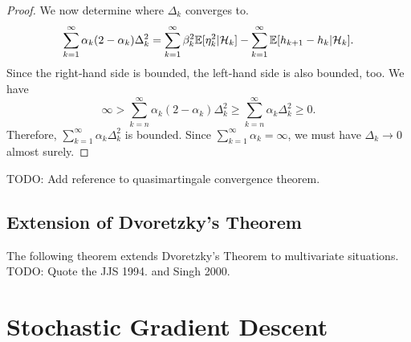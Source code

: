 \begin{proof}
        We now determine where $\Delta_k$ converges to.
        \begin{equation}
            \sum_{k=1}^{\infty}\alpha_k(2-\alpha_k)\Delta_k^2 = \sum_{k=1}^{\infty}\beta_k^2\mathbb{E}[\eta_k^2|\mathcal{H}_k] - \sum_{k=1}^{\infty}\mathbb{E}[h_{k+1}-h_k|\mathcal{H}_k].
        \end{equation}
        Since the right-hand side is bounded, the left-hand side is also bounded, too. We have
        \begin{equation}
            \infty > \sum_{k=n}^{\infty}\alpha_k(2-\alpha_k)\Delta_k^2 \geq \sum_{k=n}^{\infty}\alpha_k\Delta_k^2 \geq 0.
        \end{equation}
        Therefore, $\sum_{k=1}^{\infty}\alpha_k\Delta_k^2$ is bounded. Since $\sum_{k=1}^{\infty}\alpha_k = \infty$, we must have $\Delta_k \to 0$ almost surely.

    \end{proof}
    TODO: Add reference to quasimartingale convergence theorem.
    \subsection{Extension of Dvoretzky's Theorem}
        The following theorem extends Dvoretzky's Theorem to multivariate situations.
        TODO: Quote the JJS 1994. and Singh 2000.

\section{Stochastic Gradient Descent}